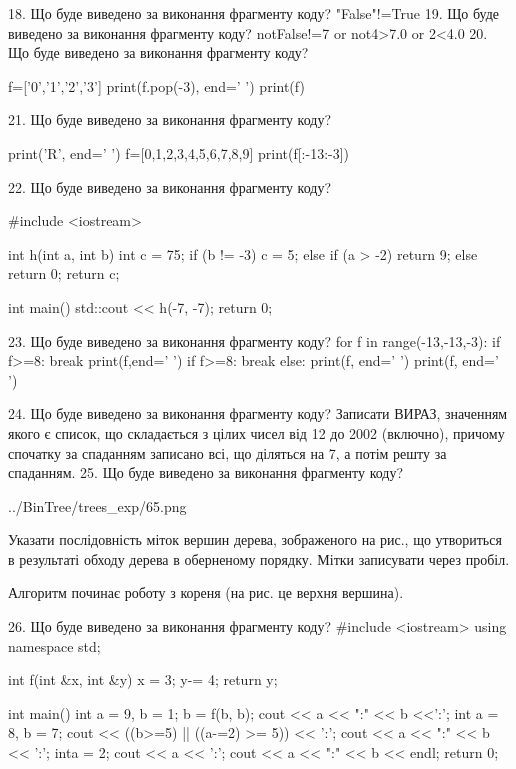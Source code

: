 \documentclass[11pt]{article}
\begin{document}
18. Що буде виведено за виконання фрагменту коду?
"False"!=True
19. Що буде виведено за виконання фрагменту коду?
notFalse!=7 or not4>7.0 or 2<4.0
20. Що буде виведено за виконання фрагменту коду?

f=['0','1','2','3']
print(f.pop(-3), end=' ')
print(f)


21. Що буде виведено за виконання фрагменту коду?

print('R', end=' ')
f=[0,1,2,3,4,5,6,7,8,9]
print(f[:-13:-3])


22. Що буде виведено за виконання фрагменту коду?

#include <iostream>

int h(int a, int b){
    int c = 75;
    if (b != -3)
        c = 5;
    else if (a > -2)
         return 9;
    else 
        return 0;
    return c;
}

int main(){
    std::cout << h(-7, -7);
    return 0;
}

23. Що буде виведено за виконання фрагменту коду?
for f in range(-13,-13,-3):
    if f>=8:
        break
        print(f,end=' ')
    if f>=8:
        break
else:
    print(f, end=' ')
print(f, end=' ')

24. Що буде виведено за виконання фрагменту коду?
Записати ВИРАЗ, значенням якого є список, що складається з цілих чисел від 12 до 2002 (включно), причому спочатку за спаданням записано всі, що діляться на 7, а потім решту за спаданням.
25. Що буде виведено за виконання фрагменту коду?

\begin{center}
	{../BinTree/trees_exp/65.png}
\end{center}
Указати послідовність міток вершин дерева, зображеного на рис., що утвориться в результаті обходу дерева в оберненому порядку. Мітки записувати через пробіл.\par Алгоритм починає роботу з кореня (на рис. це верхня вершина).

26. Що буде виведено за виконання фрагменту коду?
#include <iostream>
using namespace std;

int f(int &x, int &y){
    x = 3;
    y-= 4;
    return y;
}

int main(){
    int a = 9, b = 1;
    b = f(b, b);
    cout << a << ":" << b <<':';
    {
        int a = 8, b = 7;
        cout << ((b>=5) || ((a-=2) >= 5)) << ':';
        cout << a << ":" << b << ':';
    }
    {
        inta = 2;
        cout << a << ':';
    }
    cout << a << ":" << b << endl;
    return 0;
}
\end{document}
